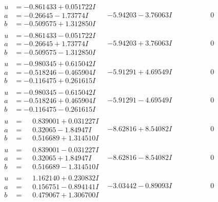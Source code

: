 \documentclass[1p]{elsarticle_modified}
\theoremstyle{definition}
\begin{document}
$$\begin{array}{c|c|c}
\begin{aligned}
u &= -0.861433 + 0.051722 I \\
a &= -0.26645 - 1.73774 I \\
b &= -0.509575 + 1.312850 I\end{aligned}
 & -5.94203 - 3.76063 I & \phantom{-0.000000 } 0 \\ \hline\begin{aligned}
u &= -0.861433 - 0.051722 I \\
a &= -0.26645 + 1.73774 I \\
b &= -0.509575 - 1.312850 I\end{aligned}
 & -5.94203 + 3.76063 I & \phantom{-0.000000 } 0 \\ \hline\begin{aligned}
u &= -0.980345 + 0.615042 I \\
a &= -0.518246 - 0.465904 I \\
b &= -0.116475 + 0.261615 I\end{aligned}
 & -5.91291 + 4.69549 I & \phantom{-0.000000 } 0 \\ \hline\begin{aligned}
u &= -0.980345 - 0.615042 I \\
a &= -0.518246 + 0.465904 I \\
b &= -0.116475 - 0.261615 I\end{aligned}
 & -5.91291 - 4.69549 I & \phantom{-0.000000 } 0 \\ \hline\begin{aligned}
u &= \phantom{-}0.839001 + 0.031227 I \\
a &= \phantom{-}0.32065 - 1.84947 I \\
b &= \phantom{-}0.516689 + 1.314510 I\end{aligned}
 & -8.62816 + 8.54082 I & \phantom{-0.000000 } 0 \\ \hline\begin{aligned}
u &= \phantom{-}0.839001 - 0.031227 I \\
a &= \phantom{-}0.32065 + 1.84947 I \\
b &= \phantom{-}0.516689 - 1.314510 I\end{aligned}
 & -8.62816 - 8.54082 I & \phantom{-0.000000 } 0 \\ \hline\begin{aligned}
u &= \phantom{-}1.162140 + 0.230832 I \\
a &= \phantom{-}0.156751 - 0.894141 I \\
b &= \phantom{-}0.479067 + 1.306700 I\end{aligned}
 & -3.03442 - 0.89093 I & \phantom{-0.000000 } 0 \\ \hline\begin{aligned}

\end{aligned}
\end{array}$$
\end{document}
